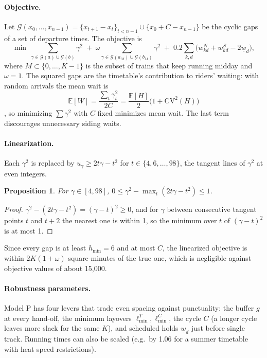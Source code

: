 \documentclass[11pt]{article}
\newtheorem{proposition}{Proposition}
\begin{document}
\paragraph{Objective.} Let $\mathcal{G}(x_0,\dots,x_{n-1})=\{x_{t+1}-x_t\}_{t<n-1}\cup\{x_0+C-x_{n-1}\}$ be the cyclic gaps of a set of departure times. The objective is
\begin{equation}\label{eq:P-obj}
\min\ \sum_{\gamma\in\mathcal{G}(a)\cup\mathcal{G}(b)}\gamma^2\;+\;\omega\sum_{\gamma\in\mathcal{G}(a_M)\cup\mathcal{G}(b_M)}\gamma^2\;+\;0.2\sum_{k,d}\bigl(w^N_{kd}+w^S_{kd}-2\underline w_d\bigr),
\end{equation}
where $M\subset\{0,\dots,K-1\}$ is the subset of trains that keep running midday and $\omega=1$. The squared gaps are the timetable's contribution to riders' waiting: with random arrivals the mean wait is
\begin{equation}\label{eq:wait}
\mathbb{E}[W]=\frac{\sum_t\gamma_t^2}{2C}=\frac{\mathbb{E}[H]}{2}\bigl(1+\mathrm{CV}^2(H)\bigr)
\end{equation}
\citep{welding1957instability,osuna1972control}, so minimizing $\sum\gamma^2$ with $C$ fixed minimizes mean wait. The last term discourages unnecessary siding waits.

\paragraph{Linearization.} Each $\gamma^2$ is replaced by $u_\gamma\ge 2t\gamma-t^2$ for $t\in\{4,6,\dots,98\}$, the tangent lines of $\gamma^2$ at even integers.
\begin{proposition}
For $\gamma\in[4,98]$, $0\le\gamma^2-\max_t(2t\gamma-t^2)\le 1$.
\end{proposition}
\begin{proof}
$\gamma^2-(2t\gamma-t^2)=(\gamma-t)^2\ge0$, and for $\gamma$ between consecutive tangent points $t$ and $t+2$ the nearest one is within 1, so the minimum over $t$ of $(\gamma-t)^2$ is at most 1.
\end{proof}
Since every gap is at least $h_{\min}=6$ and at most $C$, the linearized objective is within $2K(1+\omega)$ square-minutes of the true one, which is negligible against objective values of about 15{,}000.

\paragraph{Robustness parameters.} Model P has four levers that trade even spacing against punctuality: the buffer $g$ at every hand-off, the minimum layovers $\ell_{\min}^T,\ell_{\min}^C$, the cycle $C$ (a longer cycle leaves more slack for the same $K$), and scheduled holds $\underline w_d$ just before single track. Running times can also be scaled (e.g.\ by 1.06 for a summer timetable with heat speed restrictions).
\end{document}
